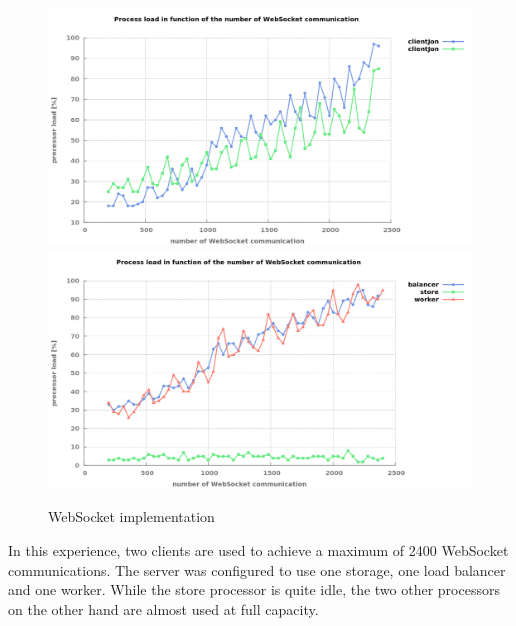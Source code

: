 \begin{figure}[H]
	\centering
		\includegraphics[width=\textwidth]{./Figures/WS_client_comparaison.png}
		\includegraphics[width=\textwidth]{./Figures/WS_server_comparaison.png}
	\caption[WebSocket implementation]{WebSocket implementation}
	\label{fig:WS_comparaison}
\end{figure}

In this experience, two clients are used to achieve a maximum of 2400 WebSocket
communications.  The server was configured to use one storage, one load
balancer and one worker. While the store processor is quite idle, the two other
processors on the other hand are almost used at full capacity.

